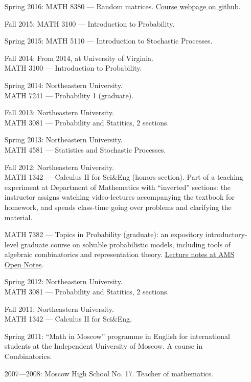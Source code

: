 \documentclass[letterpaper,11pt]{article}
\begin{document}
\begin{itemize}
\item[Spring 2016:]
	MATH 8380 --- Random matrices. \href{https://github.com/lenis2000/RMT_Spring_2016}{Course webpage on github}.

\item[Fall 2015:]
	MATH 3100 --- Introduction to Probability.

\item[Spring 2015:]
	MATH 5110 --- Introduction to Stochastic Processes.

	\item
	      [Fall 2014:]
	      From 2014, at University of Virginia. \\ MATH 3100 --- Introduction to
	      Probability.

	\item
	      [Spring 2014:]
	      Northeastern University. \\ MATH 7241 --- Probability 1
	      (graduate).

	\item
	      [Fall 2013:]
	      Northeastern University. \\ MATH 3081 --- Probability and
	      Statitics, 2 sections.
	\item
	      [Spring 2013:]
	      Northeastern University. \\ MATH 4581 --- Statistics and
	      Stochastic Processes.
	\item
	      [Fall 2012:]
	      Northeastern University. \\ MATH 1342 --- Calculus II for
	      Sci\&Eng (honors section). Part of a teaching experiment at Department of
	      Mathematics with ``inverted'' sections: the instructor assigns watching
	      video-lectures accompanying the textbook for homework, and spends class-time
	      going over problems and clarifying the material.

	      MATH 7382 --- Topics in Probability (graduate): an expository
	      introductory-level graduate course on solvable probabilistic models, including
	      tools of algebraic combinatorics and representation theory.
		  \href{https://www.ams.org/open-math-notes/omn-view-listing?listingId=110813}{Lecture notes at AMS Open Notes}.

	\item
	      [Spring 2012:]
	      Northeastern University. \\ MATH 3081 --- Probability and
	      Statitics, 2 sections.
	\item
	      [Fall 2011:]
	      Northeastern University.\\ MATH 1342 --- Calculus II for
	      Sci\&Eng.
	\item
	      [Spring 2011:]
	      ``Math in Moscow'' programme in English for international
	      students at the Independent University of Moscow. A course in
	      Combinatorics.

	\item
	      [2007---2008:]
	      Moscow High School No. 17. Teacher of mathematics.
\end{itemize}
\end{document}
